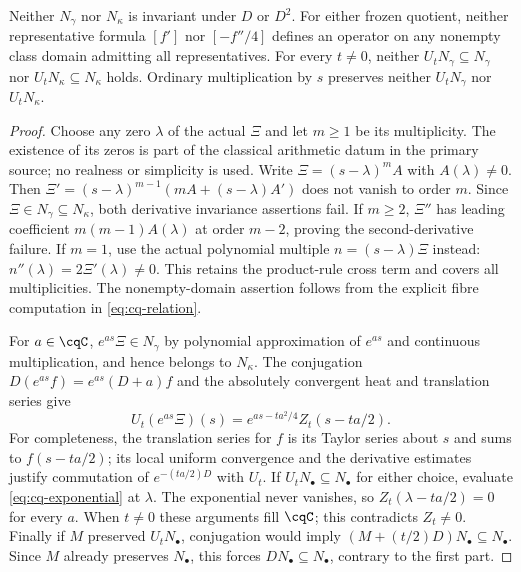 \begin{cqtheorem}
\label{thm:cq-obstruction}
Neither $N_\gamma$ nor $N_\kappa$ is invariant under $D$ or $D^2$.
For either frozen quotient, neither representative formula $[f']$
nor $[-f''/4]$ defines an operator on any nonempty class domain
admitting all representatives.
For every $t\ne0$, neither $U_tN_\gamma\subseteq N_\gamma$ nor
$U_tN_\kappa\subseteq N_\kappa$ holds. Ordinary multiplication
by $s$ preserves neither $U_tN_\gamma$ nor $U_tN_\kappa$.
\end{cqtheorem}
\begin{proof}
Choose any zero $\lambda$ of the actual $\Xi$ and let $m\geq1$
be its multiplicity. The existence of its zeros is part of the
classical arithmetic datum in the primary source; no realness or
simplicity is used. Write $\Xi=(s-\lambda)^mA$ with
$A(\lambda)\ne0$. Then $\Xi'=(s-\lambda)^{m-1}
(mA+(s-\lambda)A')$ does not vanish to order $m$.
Since $\Xi\in N_\gamma\subseteq N_\kappa$, both derivative
invariance assertions fail. If $m\geq2$, $\Xi''$ has leading
coefficient $m(m-1)A(\lambda)$ at order $m-2$, proving the
second-derivative failure. If $m=1$, use the actual polynomial
multiple $n=(s-\lambda)\Xi$ instead: $n''(\lambda)=2\Xi'(\lambda)
\ne0$. This retains the product-rule cross term and covers all
multiplicities. The nonempty-domain assertion follows from the
explicit fibre computation in \eqref{eq:cq-relation}.

For $a\in\cqC$, $e^{as}\Xi\in N_\gamma$ by polynomial
approximation of $e^{as}$ and continuous multiplication, and hence
belongs to $N_\kappa$. The conjugation $D(e^{as}f)=e^{as}(D+a)f$
and the absolutely convergent heat and translation series give
\begin{equation}\label{eq:cq-exponential}
 U_t(e^{as}\Xi)(s)
    =e^{as-ta^2/4}Z_t(s-ta/2).
\end{equation}
For completeness, the translation series for $f$ is its Taylor
series about $s$ and sums to $f(s-ta/2)$; its local uniform
convergence and the derivative estimates justify commutation of
$e^{-(ta/2)D}$ with $U_t$. If $U_tN_\bullet\subseteq N_\bullet$
for either choice, evaluate \eqref{eq:cq-exponential} at $\lambda$.
The exponential never vanishes, so $Z_t(\lambda-ta/2)=0$ for
every $a$. When $t\ne0$ these arguments fill $\cqC$; this contradicts
$Z_t\ne0$. Finally if $M$ preserved $U_tN_\bullet$, conjugation
would imply $(M+(t/2)D)N_\bullet\subseteq N_\bullet$.
Since $M$ already preserves $N_\bullet$, this forces
$DN_\bullet\subseteq N_\bullet$, contrary to the first part.
\end{proof}

